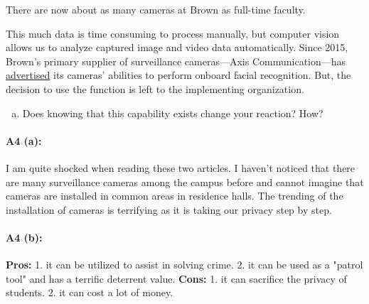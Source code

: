 There are now about as many cameras at Brown as full-time faculty.

%
% 


This much data is time consuming to process manually, but computer vision allows us to analyze captured image and video data automatically.
Since 2015, Brown’s primary supplier of surveillance cameras---Axis Communication---has \href{https://www.axis.com/customer-story/3767}{advertised} its cameras’ abilities to perform onboard facial recognition. But, the decision to use the function is left to the implementing organization.

\begin{enumerate}[(c)]
    \item Does knowing that this capability exists change your reaction? How?
\end{enumerate}

\paragraph{A4 (a):}
I am quite shocked when reading these two articles. I haven't noticed that there are many surveillance cameras among the campus before and cannot imagine that cameras are installed in common areas in residence halls. The trending of the installation of cameras is terrifying as it is taking our privacy step by step.

\paragraph{A4 (b):} \textbf{Pros:} 1. it can be utilized to assist in solving crime. 2. it can be used as a "patrol tool" and has a terrific deterrent value. \textbf{Cons:} 1. it can sacrifice the privacy of students. 2. it can cost a lot of money.



